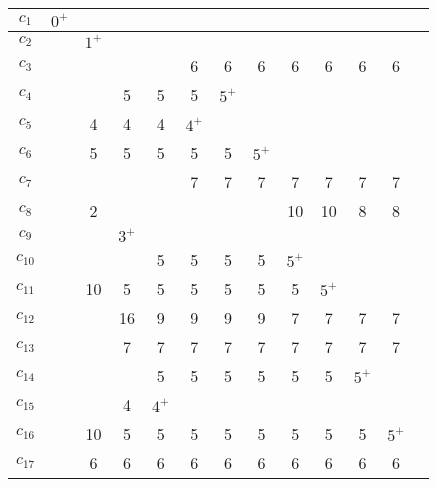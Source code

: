 \documentclass[12pt, a4paper] {ncc}
\begin{document}
\begin{enumerate}
\begin{tabular} {|c|c|c|c|c|c|c|c|c|c|c|c|c|}
    \hline
    $c_{1}$  &$0^+$&      &     &     &     &     &     &      &     &     &       \\ \hline
    $c_{2}$  & \z  &$1^+$ &     &     &     &     &     &      &     &     &       \\ \hline
    $c_{3}$  & \z  & \z   & \z  &\z   & 6   &  6  &  6  &  6   & 6   & 6   & 6     \\ \hline
    $c_{4}$  & \z  & \z   & 5   & 5   & 5   &$5^+$&     &      &     &     &       \\ \hline
    $c_{5}$  & \z  & 4    & 4   & 4   &$4^+$&     &     &      &     &     &       \\ \hline
    $c_{6}$  & \z  & 5    & 5   & 5   & 5   &  5  &$5^+$&      &     &     &       \\ \hline
    $c_{7}$  & \z  & \z   & \z  & \z  & 7   &  7  &  7  &  7   & 7   & 7   & 7     \\ \hline
    $c_{8}$  & \z  & 2    & \z  & \z  & \z  &  \z & \z  &  10  & 10  & 8   & 8     \\ \hline
    $c_{9}$  & \z  & \z   &$3^+$&     &     &     &     &      &     &     &       \\ \hline
    $c_{10}$ & \z  & \z   & \z  & 5   & 5   &  5  &  5  &$5^+$ &     &     &       \\ \hline
    $c_{11}$ & \z  & 10   &  5  & 5   & 5   &  5  &  5  &  5   &$5^+$&     &       \\ \hline
    $c_{12}$ & \z  & \z   & 16  & 9   & 9   &  9  &  9  &  7   & 7   & 7   & 7     \\ \hline
    $c_{13}$ & \z  & \z   & 7   & 7   & 7   &  7  &  7  &  7   & 7   & 7   & 7     \\ \hline
    $c_{14}$ & \z  & \z   & \z  & 5   & 5   &  5  &  5  &  5   & 5   &$5^+$&       \\ \hline
    $c_{15}$ & \z  & \z   & 4   &$4^+$&     &     &     &      &     &     &       \\ \hline
    $c_{16}$ & \z  & 10   & 5   & 5   & 5   &  5  &  5  &  5   & 5   & 5   &$5^+$     \\ \hline
    $c_{17}$ & \z  & 6    & 6   & 6   & 6   &  6  &  6  &  6   & 6   & 6   & 6     \\ \hline 
\end{tabular}


\end{enumerate}
\end{document}
